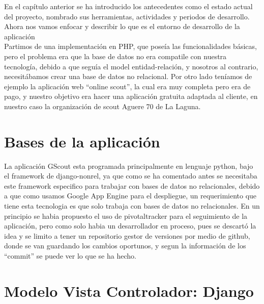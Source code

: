 

En el capítulo anterior se ha introducido los antecedentes como el estado actual del proyecto, 
nombrado sus herramientas, actividades y periodos de desarrollo. Ahora nos vamos enfocar y describir lo que es el
entorno de desarrollo de la aplicación\\

Partimos de una implementación en PHP, que poseía las funcionalidades básicas, pero el problema era que la base de datos
no era compatile con nuestra tecnología, debido a que seguía el model entidad-relación, y nosotros al contrario, necesitábamos
crear una base de datos no relacional. Por otro lado teníamos de ejemplo la aplicación web ``online scout'', la cual era muy completa
pero era de pago, y nuestro objetivo era hacer una aplicación gratuita adaptada al cliente, en nuestro caso la organización de scout Aguere 70 de La Laguna.



\section{Bases de la aplicación}
\label{2:sec1}

La aplicación GScout esta programada principalmente en lenguaje python, bajo el framework de django-nonrel,  
ya que como se ha comentado antes se necesitaba este framework especifico para trabajar con bases de datos no relacionales,
debido a que como usamos Google App Engine para el despliegue, un requerimiento que tiene esta tecnologia es que solo trabaja con
bases de datos no relacionales. En un principio se habia propuesto el uso de pivotaltracker para el seguimiento de la aplicación, 
pero como solo habia un desarrollador en proceso, pues se descartó la idea y se limito a tener un repositorio gestor de versiones por medio de
github, donde se van guardando los cambios oportunos, y segun la información de los ``commit'' se puede ver lo que se ha hecho.

\section{Modelo Vista Controlador: Django}
\label{2:sec2}

